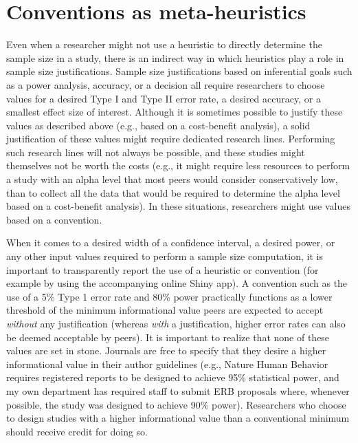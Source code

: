 \documentclass[
]{krantz}
\begin{document}
\hypertarget{conventions-as-meta-heuristics}{%
\section{Conventions as meta-heuristics}\label{conventions-as-meta-heuristics}}

Even when a researcher might not use a heuristic to directly determine the sample size in a study, there is an indirect way in which heuristics play a role in sample size justifications. Sample size justifications based on inferential goals such as a power analysis, accuracy, or a decision all require researchers to choose values for a desired Type I and Type II error rate, a desired accuracy, or a smallest effect size of interest. Although it is sometimes possible to justify these values as described above (e.g., based on a cost-benefit analysis), a solid justification of these values might require dedicated research lines. Performing such research lines will not always be possible, and these studies might themselves not be worth the costs (e.g., it might require less resources to perform a study with an alpha level that most peers would consider conservatively low, than to collect all the data that would be required to determine the alpha level based on a cost-benefit analysis). In these situations, researchers might use values based on a convention.

When it comes to a desired width of a confidence interval, a desired power, or any other input values required to perform a sample size computation, it is important to transparently report the use of a heuristic or convention (for example by using the accompanying online Shiny app). A convention such as the use of a 5\% Type 1 error rate and 80\% power practically functions as a lower threshold of the minimum informational value peers are expected to accept \emph{without} any justification (whereas \emph{with} a justification, higher error rates can also be deemed acceptable by peers). It is important to realize that none of these values are set in stone. Journals are free to specify that they desire a higher informational value in their author guidelines (e.g., Nature Human Behavior requires registered reports to be designed to achieve 95\% statistical power, and my own department has required staff to submit ERB proposals where, whenever possible, the study was designed to achieve 90\% power). Researchers who choose to design studies with a higher informational value than a conventional minimum should receive credit for doing so.
\end{document}
